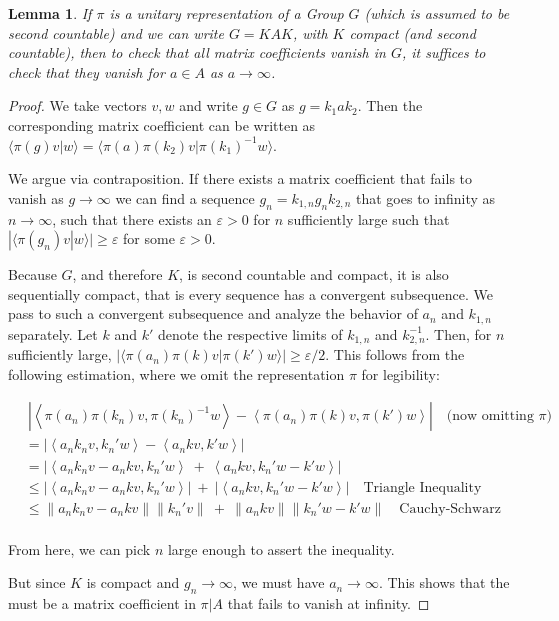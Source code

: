 \documentclass[
  12pt
]{article}
\numberwithin{equation}{section}
\newtheorem{lem}[thm]{Lemma}
\theoremstyle{plain}
\newtheorem*{proof}{Proof}
\newcommand{\G}{\ensuremath{G}\xspace}
\newcommand{\abs}[1]{| #1 |}
\newcommand{\inn}[1]{\left\langle #1 \right\rangle}
\newcommand{\norm}[1]{\lVert #1 \rVert}
\begin{document}
  \begin{lem}
    \label{lemma}
    If $\pi$ is a unitary representation of a Group $G$ (which is assumed to be second countable) and we can write $G =
    KAK$, with $K$ compact (and second countable), then to check that all matrix
    coefficients vanish in \G, it suffices to check that they vanish for $a \in A$ as $a \rightarrow \infty$.
  \end{lem}

  \begin{proof}
    \label{pf:lemma}
    We take vectors $v, w$ and write $g \in G$ as $g = k_1 a k_2$.
    Then the corresponding matrix
    coefficient can be written as $\langle \pi(g)v|w \rangle = \langle \pi(a) \pi(k_2) v | \pi(k_1)^{-1} w \rangle$.

    We argue via contraposition.
    If there exists a matrix coefficient that fails to vanish as $g \rightarrow \infty$
    we can find a sequence $g_n = k_{1,n} g_{n} k_{2,n}$ that goes to infinity as
    $n \rightarrow \infty$, such that there exists an $\varepsilon > 0$ for $n$ sufficiently large such that
    $|\langle \pi(g_n) v | w \rangle | \geq \varepsilon$ for some $\varepsilon > 0$.

    Because $G$, and therefore $K$, is second countable and compact, it is also
    sequentially compact, that is every sequence has a convergent subsequence.
    We pass to such a convergent subsequence and analyze the behavior of $a_n$ and $k_{1,n}$ separately.
    Let $k$ and $k'$ denote the respective limits of $k_{1,n}$ and $k_{2,n}^{-1}$.
    Then, for $n$ sufficiently large, $|\langle \pi(a_n)\pi(k)v | \pi(k') w \rangle | \geq \varepsilon/2$.
    This follows from the following estimation, where we omit the representation $\pi$ for legibility:

    \begin{align*}
      &\ \abs{\inn{\pi(a_n)\pi(k_n)v, \pi(k_n)^{-1}w}  -  \inn{\pi(a_n)\pi(k)v, \pi(k')w}} \quad \text{(now omitting $\pi$)} \\
        &=\abs{\inn{a_n k_n v, k_n' w} - \inn{a_n k v, k' w}} \\
        &= \abs{\inn{a_nk_nv - a_nkv, k_n'w} \ + \ \inn{a_nkv, k_n'w - k'w}}  \\
        &\leq \abs{\inn{a_nk_nv - a_nkv, k_n'w}} \ + \ \abs{\inn{a_nkv, k_n'w - k'w}} \quad \text{Triangle Inequality} \\
        &\leq \norm{a_nk_nv - a_nkv}\norm{k_n'v} \ + \ \norm{a_nkv}\norm{k_n'w - k'w} \quad \text{Cauchy-Schwarz} \\
     \end{align*}

    From here, we can pick $n$ large enough to assert the inequality.

    But since $K$ is compact and $g_n \rightarrow \infty$, we must have
    $a_n \rightarrow \infty$. This shows that the must be a matrix
    coefficient in $\pi | A$ that fails to vanish at infinity.
  \end{proof}
\end{document}
